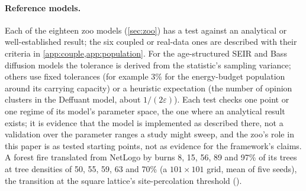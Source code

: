 \paragraph{Reference models.} Each of the eighteen zoo models (\cref{sec:zoo}) has a test
against an analytical or well-established result; the six coupled or real-data ones are
described with their criteria in \cref{app:couple,app:population}. For the age-structured SEIR and Bass
diffusion models the tolerance is derived from the statistic's sampling variance; others use
fixed tolerances (for example 3\% for the energy-budget population around its carrying
capacity) or a heuristic expectation (the number of opinion clusters in the Deffuant model,
about $1/(2\varepsilon)$). Each test checks one point or one regime of its model's
parameter space, the one where an analytical result exists; it is evidence that the model
is implemented as described there, not a validation over the parameter ranges a study
might sweep, and the zoo's role in this paper is as tested starting points, not as
evidence for the framework's claims. A forest fire translated from NetLogo by  burns 8, 15, 56, 89 and
97\% of its trees at tree densities of 50, 55, 59, 63 and 70\% (a $101 \times 101$ grid, mean
of five seeds), the transition at the square lattice's site-percolation threshold
\citep{newman2000efficient} ().
